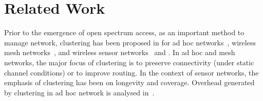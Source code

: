 \section{Related Work}
\label{related_work}

Prior to the emergence of open spectrum access, as an important method to manage network, clustering has been proposed in for ad hoc networks~\cite{Kawadia03,Lin97adaptiveclustering,Basagni99}, wireless mesh networks~\cite{Abbasi_survey_07}, and wireless sensor networks~\cite{Abbasi_survey_07} and . 
In ad hoc and mesh networks, the major focus of clustering is to preserve connectivity (under static channel conditions) or to improve routing.
In the context of sensor networks, the emphasis of clustering has been on longevity and coverage.
Overhead generated by clustering in ad hoc network is analysed in~\cite{clusterRoutingOverhead02infocom, clusterRoutingOverhead_wcnc04}.



